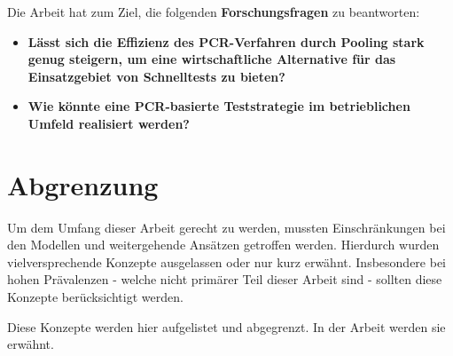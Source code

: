 Die Arbeit hat zum Ziel, die folgenden \textbf{Forschungsfragen} zu beantworten:
\begin{itemize}
	\item \textbf{Lässt sich die Effizienz des PCR-Verfahren durch Pooling stark genug steigern, um eine wirtschaftliche Alternative für das Einsatzgebiet von Schnelltests zu bieten?}
	\item \textbf{Wie könnte eine PCR-basierte Teststrategie im betrieblichen Umfeld realisiert werden?}
\end{itemize}

\section{Abgrenzung}
Um dem Umfang dieser Arbeit gerecht zu werden, mussten Einschränkungen bei den Modellen und weitergehende Ansätzen getroffen werden.
Hierdurch wurden vielversprechende Konzepte ausgelassen oder nur kurz erwähnt.
Insbesondere bei hohen Prävalenzen - welche nicht primärer Teil dieser Arbeit sind - sollten diese Konzepte berücksichtigt werden.

Diese Konzepte werden hier aufgelistet und abgegrenzt.
In der Arbeit werden sie erwähnt.

